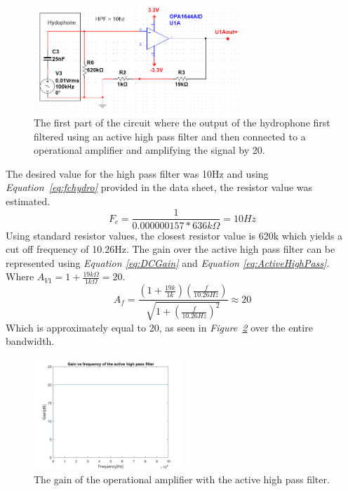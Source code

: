 \begin{figure}[h]
    \centering
    \includegraphics[width=0.70\textwidth]{graphics/OPamp1.png}
    \caption{The first part of the circuit where the output of the hydrophone first filtered using an active high pass filter and then connected to a operational amplifier and amplifying the signal by 20.}
    \label{fig:Opamp1}
\end{figure}

\vspace{4cm}

The desired value for the high pass filter was 10Hz and using \textit{Equation~\ref{eq:fchydro}} provided in the data sheet, the resistor value was estimated.   
$$F_c = \frac{1}{0.000000157 * 636k\Omega} = 10Hz$$
Using standard resistor values, the closest resistor value is 620k which yields a cut off frequency of 10.26Hz.
The gain over the active high pass filter can be represented using \textit{Equation \ref{eq:DCGain}} and \textit{Equation \ref{eq:ActiveHighPass}}. 
Where $A_{V1} = 1 + \frac{19k\Omega}{1k\Omega} = 20$.
$$A_f = \frac{(1+\frac{19k}{1k})(\frac{f}{10.26Hz})}{\sqrt{1 + (\frac{f}{10.26Hz})^2}} \approx 20$$
Which is approximately equal to 20, as seen in \textit{Figure~\ref{fig:AVhighpass}} over the entire bandwidth.

\begin{figure}[h]
    \centering
    \includegraphics[width=0.5\textwidth]{graphics/Av_Highpass.png}
    \caption{The gain of the operational amplifier with the active high pass filter.}
    \label{fig:AVhighpass}
\end{figure}

